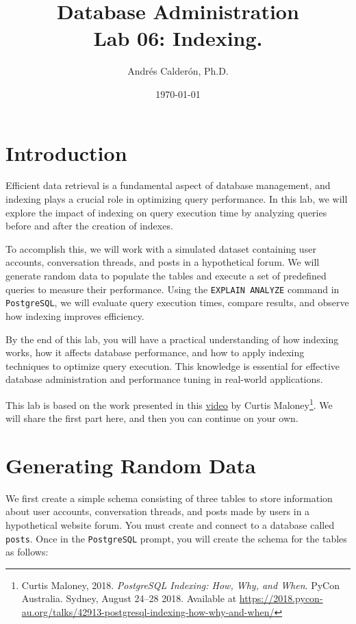\documentclass{article}
\title{Database Administration \\ Lab 06: Indexing.}
\author{Andrés Calderón, Ph.D.}
\date{\today}
\begin{document}
\maketitle

\section{Introduction}

Efficient data retrieval is a fundamental aspect of database management, and indexing plays a crucial role in optimizing query performance. In this lab, we will explore the impact of indexing on query execution time by analyzing queries before and after the creation of indexes.

To accomplish this, we will work with a simulated dataset containing user accounts, conversation threads, and posts in a hypothetical forum. We will generate random data to populate the tables and execute a set of predefined queries to measure their performance. Using the \texttt{EXPLAIN ANALYZE} command in \texttt{PostgreSQL}, we will evaluate query execution times, compare results, and observe how indexing improves efficiency.

By the end of this lab, you will have a practical understanding of how indexing works, how it affects database performance, and how to apply indexing techniques to optimize query execution. This knowledge is essential for effective database administration and performance tuning in real-world applications.

This lab is based on the work presented in this \href{https://youtu.be/clrtT_4WBAw?si=Q5Rmt7YVsykuS715}{video} by Curtis Maloney\footnote{Curtis Maloney, 2018. \textit{PostgreSQL Indexing: How, Why, and When}. PyCon Australia. Sydney, August 24–28 2018. Available at \url{https://2018.pycon-au.org/talks/42913-postgresql-indexing-how-why-and-when/}}. We will share the first part here, and then you can continue on your own.

\section{Generating Random Data}
We first create a simple schema consisting of three tables to store information about user accounts, conversation threads, and posts made by users in a hypothetical website forum. You must create and connect to a database called \texttt{posts}. Once in the \texttt{PostgreSQL} prompt, you will create the schema for the tables as follows:
\end{document}
